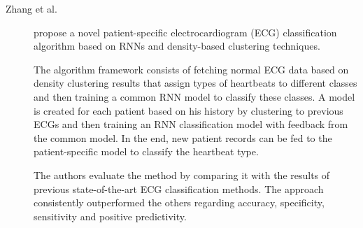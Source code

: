 \begin{description}
    \item[Zhang et al.]\cite{Zhang.Wang.ea_PatientspecificECGclassification_2017} propose a novel patient-specific electrocardiogram (ECG) classification algorithm based on RNNs and density-based clustering techniques. 
    
    The algorithm framework consists of fetching normal ECG data based on density clustering results that assign types of heartbeats to different classes and then training a common RNN model to classify these classes. A model is created for each patient based on his history by clustering to previous ECGs and then training an RNN classification model with feedback from the common model. In the end, new patient records can be fed to the patient-specific model to classify the heartbeat type.

    The authors evaluate the method by comparing it with the results of previous state-of-the-art ECG classification methods. The approach consistently outperformed the others regarding accuracy, specificity, sensitivity and positive predictivity.
\end{description}

    

